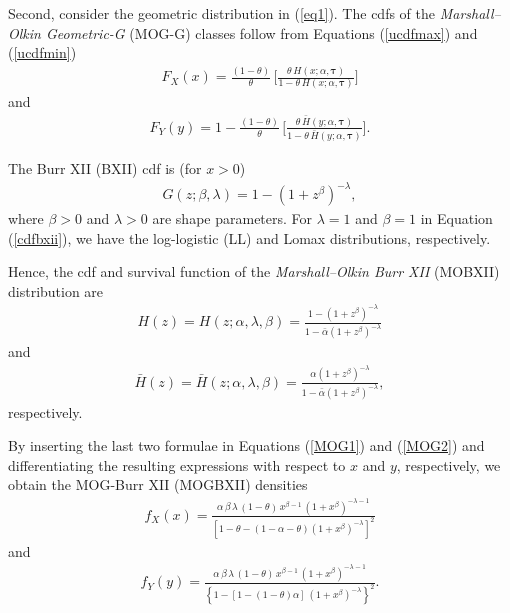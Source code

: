 \documentclass[12pt]{article}
\begin{document}
Second, consider the geometric distribution in (\ref{eq1}). The cdfs of the {\it Marshall--Olkin Geometric-G} (MOG-G) classes
follow from Equations (\ref{ucdfmax}) and (\ref{ucdfmin})
\begin{eqnarray}\label{MOG1}
F_X(x)=\frac{(1-\theta)}{\theta}\,\Bigg[\frac{\theta\,H(x;\alpha,\bm{\tau})}{1-\theta\,H(x;\alpha,\bm{\tau})}\Bigg]
\end{eqnarray}
and
\begin{eqnarray}\label{MOG2}
F_Y(y)=1-\frac{(1-\theta)}{\theta}\,\Bigg[\frac{\theta\,\bar{H}(y;\alpha,\bm{\tau})}{1-\theta\,\bar{H}(y;\alpha,\bm{\tau})}\Bigg].
\end{eqnarray}


The Burr XII (BXII) cdf is (for $x>0$)
\begin{eqnarray}\label{cdfbxii}
G(z;\beta,\lambda)= 1-\left(1+z^{\beta}\right)^{-\lambda},
\end{eqnarray}
where $\beta>0$ and $\lambda>0$ are shape parameters. For $\lambda=1$ and $\beta=1$ in Equation (\ref{cdfbxii}), we have the log-logistic (LL) 
and Lomax distributions, respectively.

Hence, the cdf and survival function of the {\it Marshall--Olkin Burr XII} (MOBXII) distribution are
\begin{eqnarray*}\label{cdfMOBXII}
H(z)=H(z;\alpha,\lambda,\beta)=\frac{1- (1+z^{\beta})^{-\lambda}}{1- \bar{\alpha}(1+z^{\beta})^{-\lambda}}
\end{eqnarray*}
and
\begin{eqnarray*}\label{sfMOBXII}
\bar{H}(z)=\bar{H}(z;\alpha,\lambda,\beta)=\frac{\alpha(1+z^{\beta})^{-\lambda}}{1- \bar{\alpha}(1+z^{\beta})^{-\lambda}},
\end{eqnarray*}
respectively.

By inserting the last two formulae in Equations (\ref{MOG1}) and (\ref{MOG2}) and differentiating the resulting expressions
with respect to $x$ and $y$, respectively, we obtain the MOG-Burr XII (MOGBXII) densities
\begin{eqnarray}\label{MOBXII1}
f_X(x)=\frac{\alpha\,\beta\,\lambda\,(1-\theta)\,x^{\beta-1}\,(1+x^{\beta})^{-\lambda-1}}{\left[1-\theta-(1-\alpha-\theta)(1+x^{\beta})^{-\lambda}\right]^2}
\end{eqnarray}
and
\begin{eqnarray}\label{MOBXII2}
f_Y(y)=\frac{\alpha\,\beta\,\lambda\,(1-\theta)\, x^{\beta-1}\,(1+x^{\beta})^{-\lambda-1}}{\left\{1-[1-(1-\theta)\alpha]\,(1+x^{\beta})^{-\lambda}\right\}^2}.
\end{eqnarray}
\end{document}
